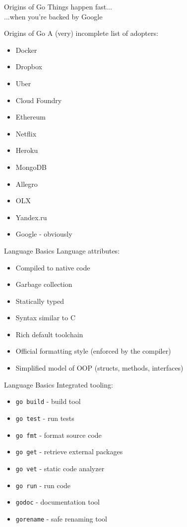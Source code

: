 \documentclass[pdf,xcolor=dvipsnames,noparindent]{beamer}
\begin{document}
\begin{frame}{Origins of Go}
  \pause
  Things happen fast...\\
  \pause
  ...when you're backed by Google
\end{frame}

\begin{frame}{Origins of Go}
  \pause
  A (very) incomplete list of adopters:
  \begin{itemize}
  \item Docker
    \pause
  \item Dropbox
    \pause
  \item Uber
    \pause
  \item Cloud Foundry
    \pause
  \item Ethereum
    \pause
  \item Netflix
    \pause
  \item Heroku
    \pause
  \item MongoDB
    \pause
  \item Allegro
    \pause
  \item OLX
    \pause
  \item Yandex.ru
    \pause
  \item Google - obviously
  \end{itemize}
\end{frame}

\begin{frame}{Language Basics}
  \pause
  Language attributes:
  \begin{itemize}
    \pause
  \item Compiled to native code
    \pause
  \item Garbage collection
    \pause
  \item Statically typed
    \pause
  \item Syntax similar to C
    \pause
  \item Rich default toolchain
    \pause
  \item Official formatting style (enforced by the compiler)
    \pause
  \item Simplified model of OOP (structs, methods, interfaces)
  \end{itemize}
\end{frame}

\begin{frame}{Language Basics}
  Integrated tooling:
  \pause
  \begin{itemize}
  \item \texttt{go build} - build tool
    \pause
  \item \texttt{go test} - run tests
    \pause
  \item \texttt{go fmt} - format source code
    \pause
  \item \texttt{go get} - retrieve external packages
    \pause
  \item \texttt{go vet} - static code analyzer
    \pause
  \item \texttt{go run} - run code
    \pause
  \item \texttt{godoc} - documentation tool
    \pause
  \item \texttt{gorename} - safe renaming tool
  \end{itemize}
\end{frame}
\end{document}
